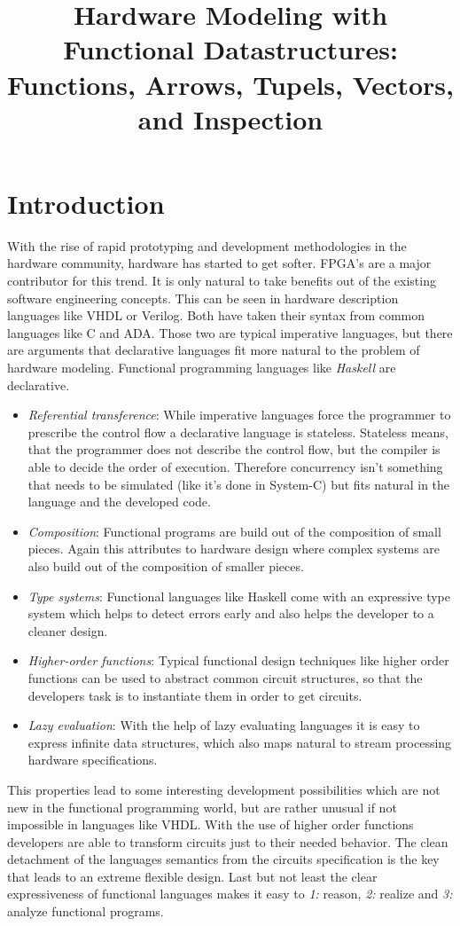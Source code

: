 \documentclass[9pt,final,a4paper,leqno]{article}
\title{Hardware Modeling with Functional Datastructures: Functions, Arrows, Tupels, Vectors, and Inspection}
\begin{document}
\section{Introduction}
\label{introduction}
With the rise of rapid prototyping and development methodologies in the hardware community, hardware has started to get softer. FPGA's are a
major contributor for this trend. It is only natural to take benefits out of the existing software engineering concepts. This can be seen in
hardware description languages like VHDL or Verilog. Both have taken their syntax from common languages like C and ADA\@. Those two are
typical imperative languages, but there are arguments that declarative languages fit more natural to the problem of hardware modeling.
Functional programming languages like \emph{Haskell} are declarative.

\begin{itemize}
  \item \emph{Referential transference}: While imperative languages force the programmer to prescribe the control flow a declarative
    language is stateless. Stateless means, that the programmer does not describe the control flow, but the compiler is able to decide the
    order of execution. Therefore concurrency isn't something that needs to be simulated (like it's done in System-C) but fits natural in
    the language and the developed code.
  \item \emph{Composition}: Functional programs are build out of the composition of small pieces. Again this attributes to hardware design
    where complex systems are also build out of the composition of smaller pieces.
  \item \emph{Type systems}: Functional languages like Haskell come with an expressive type system which helps to detect errors early and
    also helps the developer to a cleaner design.
  \item \emph{Higher-order functions}: Typical functional design techniques like higher order functions can be used to abstract common
    circuit structures, so that the developers task is to instantiate them in order to get circuits.
  \item \emph{Lazy evaluation}: With the help of lazy evaluating languages it is easy to express infinite data structures, which also maps
    natural to stream processing hardware specifications. 
\end{itemize}

This properties lead to some interesting development possibilities which are not new in the functional programming world, but are rather
unusual if not impossible in languages like VHDL\@. With the use of higher order functions developers are able to transform circuits just to
their needed behavior. The clean detachment of the languages semantics from the circuits specification is the key that leads to an extreme
flexible design. Last but not least the clear expressiveness of functional languages makes it easy to \emph{1:} reason, \emph{2:} realize
and \emph{3:} analyze functional programs. %
\end{document}
